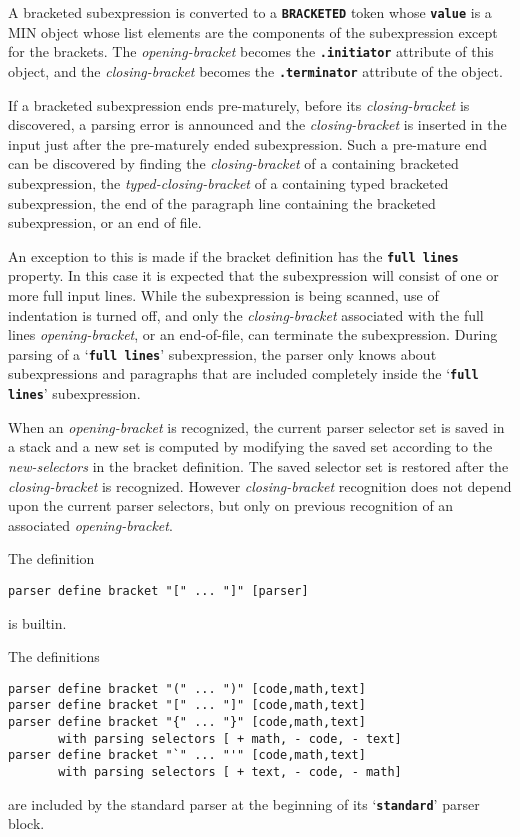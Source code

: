 \documentclass[12pt]{article}
\makeatletter
\newcommand{\TT}[1]{{\tt \bfseries #1}}
\newcommand{\ttmkey}[2]{\TT{#1}\index{#1@{\tt #1}!#2}}
\newenvironment{indpar}[1][0.3in]%
	{\begin{list}{}%
		     {\setlength{\itemsep}{0in}%
		      \setlength{\topsep}{0in}%
		      \setlength{\parsep}{1ex}%
		      \setlength{\labelwidth}{#1}%
		      \setlength{\leftmargin}{#1}%
		      \addtolength{\leftmargin}{\labelsep}}%
	 \item}%
	{\end{list}}
\makeatother
\begin{document}
A bracketed subexpression is converted to a \TT{BRACKETED}
token whose \TT{value} is a
MIN object whose list elements are the components of the
subexpression except for the brackets.  The
{\em opening-bracket} becomes the \TT{.initiator}
attribute of this object, and the {\em closing-bracket}
becomes the \TT{.terminator} attribute of the object.

If a bracketed subexpression ends pre-maturely, before
its {\em closing-bracket} is discovered, a parsing error is
announced and the {\em closing-bracket} is inserted in the input
just after the pre-maturely ended subexpression.  Such a pre-mature end can be
discovered by finding the {\em closing-bracket} of a containing
bracketed subexpression, the {\em typed-closing-bracket}
of a containing typed bracketed subexpression, the end of the paragraph line
containing the bracketed subexpression,
or an end of file.

An exception to this is made if the bracket definition has the
\ttmkey{full lines}{in bracket definition} property.  In this case
it is expected that the subexpression will consist of one or
more full input lines.  While the subexpression is being scanned,
use of indentation is turned off, and only the {\em closing-bracket}
associated with the full lines {\em opening-bracket}, or an
end-of-file,
can terminate the subexpression.  During parsing of a
`\TT{full lines}' subexpression, the parser only knows about
subexpressions and paragraphs that are included completely inside the
`\TT{full lines}' subexpression.

When an {\em opening-bracket} is recognized, the current parser
selector set is saved in a stack and
a new set is computed by modifying the saved set
according to the {\em new-selectors} in the bracket definition.
The saved selector set is restored after the {\em closing-bracket}
is recognized.  However {\em closing-bracket}
recognition does not depend
upon the current parser selectors, but only on previous recognition
of an associated {\em opening-bracket}.

The definition
\begin{indpar}\begin{verbatim}
parser define bracket "[" ... "]" [parser]
\end{verbatim}\end{indpar}
is builtin.

The definitions
\begin{indpar}\begin{verbatim}
parser define bracket "(" ... ")" [code,math,text]
parser define bracket "[" ... "]" [code,math,text]
parser define bracket "{" ... "}" [code,math,text]
       with parsing selectors [ + math, - code, - text]
parser define bracket "`" ... "'" [code,math,text]
       with parsing selectors [ + text, - code, - math]
\end{verbatim}\end{indpar}
are included by the standard parser at the beginning of
its `\TT{standard}' parser block.
\end{document}
